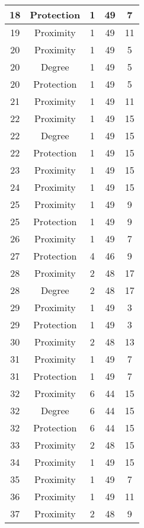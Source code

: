 \documentclass[results.tex]{subfiles}
\begin{document}
\begin{center}
\begin{tabular}{| c || c | c | c | c |}
    \hline
    18 & Protection & 1 & 49 & 7 \\ 
    \hline
    19 & Proximity & 1 & 49 & 11 \\ 
    \hline
    20 & Proximity & 1 & 49 & 5 \\ 
    \hline
    20 & Degree & 1 & 49 & 5 \\ 
    \hline
    20 & Protection & 1 & 49 & 5 \\ 
    \hline
    21 & Proximity & 1 & 49 & 11 \\ 
    \hline
    22 & Proximity & 1 & 49 & 15 \\ 
    \hline
    22 & Degree & 1 & 49 & 15 \\ 
    \hline
    22 & Protection & 1 & 49 & 15 \\ 
    \hline
    23 & Proximity & 1 & 49 & 15 \\ 
    \hline
    24 & Proximity & 1 & 49 & 15 \\ 
    \hline
    25 & Proximity & 1 & 49 & 9 \\ 
    \hline
    25 & Protection & 1 & 49 & 9 \\ 
    \hline
    26 & Proximity & 1 & 49 & 7 \\ 
    \hline
    27 & Protection & 4 & 46 & 9 \\ 
    \hline
    28 & Proximity & 2 & 48 & 17 \\ 
    \hline
    28 & Degree & 2 & 48 & 17 \\ 
    \hline
    29 & Proximity & 1 & 49 & 3 \\ 
    \hline
    29 & Protection & 1 & 49 & 3 \\ 
    \hline
    30 & Proximity & 2 & 48 & 13 \\ 
    \hline
    31 & Proximity & 1 & 49 & 7 \\ 
    \hline
    31 & Protection & 1 & 49 & 7 \\ 
    \hline
    32 & Proximity & 6 & 44 & 15 \\ 
    \hline
    32 & Degree & 6 & 44 & 15 \\ 
    \hline
    32 & Protection & 6 & 44 & 15 \\ 
    \hline
    33 & Proximity & 2 & 48 & 15 \\ 
    \hline
    34 & Proximity & 1 & 49 & 15 \\ 
    \hline
    35 & Proximity & 1 & 49 & 7 \\ 
    \hline
    36 & Proximity & 1 & 49 & 11 \\ 
    \hline
    37 & Proximity & 2 & 48 & 9 \\ 

\end{tabular}
\end{center}
\end{document}
